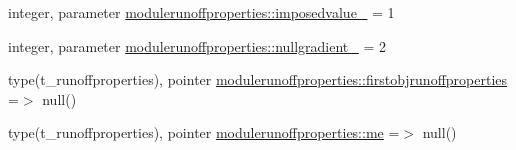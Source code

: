 \begin{DoxyCompactItemize}
\item 
integer, parameter \mbox{\hyperlink{namespacemodulerunoffproperties_ac4753cf8e53d379638385636def75840}{modulerunoffproperties\+::imposedvalue\+\_\+}} = 1
\item 
integer, parameter \mbox{\hyperlink{namespacemodulerunoffproperties_a4fac8668d857b78a77b9e1e9a745f2df}{modulerunoffproperties\+::nullgradient\+\_\+}} = 2
\item 
type(t\+\_\+runoffproperties), pointer \mbox{\hyperlink{namespacemodulerunoffproperties_a9264ee8b17d9a5c872f8e2979fca9fb9}{modulerunoffproperties\+::firstobjrunoffproperties}} =$>$ null()
\item 
type(t\+\_\+runoffproperties), pointer \mbox{\hyperlink{namespacemodulerunoffproperties_af88f6b3d96a84a70fa3db48bea40fd64}{modulerunoffproperties\+::me}} =$>$ null()
\end{DoxyCompactItemize}
